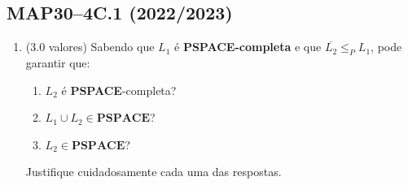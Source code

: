 \documentclass[a4paper,12pt]{article}
\begin{document}
\vspace{1.0cm}
\subsection*{MAP30–4C.1 (2022/2023)}
\begin{enumerate}[label=\alph*)] 
  \item (3.0 valores) Sabendo que \( L_1 \) é \textbf{PSPACE-completa} e que \( \overline{L_2} \leq_P L_1 \), pode garantir que:
  
  \begin{enumerate}[label=(\roman*)]
      \item \( L_2 \) é \textbf{PSPACE}-completa?
      \item \( L_1 \cup L_2 \in \textbf{PSPACE} \)?
      \item \( L_2 \in \textbf{PSPACE} \)?
  \end{enumerate}
  
  Justifique cuidadosamente cada uma das respostas.
\end{enumerate}
\end{document}
